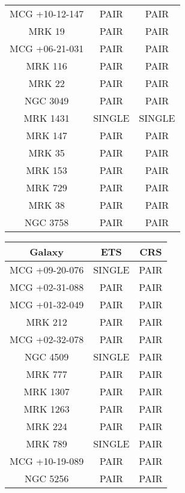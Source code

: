 \documentclass[12pt]{article}
\begin{document}
\begin{table}[!b]
{\begin{tabular}{|c|c|c|}
MCG +10-12-147 & PAIR             & PAIR             \\
MRK 19         & PAIR             & PAIR             \\
MCG +06-21-031 & PAIR             & PAIR             \\
MRK 116        & PAIR             & PAIR             \\
MRK 22         & PAIR             & PAIR             \\
NGC 3049       & PAIR             & PAIR             \\
MRK 1431       & SINGLE           & SINGLE           \\
MRK 147        & PAIR             & PAIR             \\
MRK 35         & PAIR             & PAIR             \\
MRK 153        & PAIR             & PAIR             \\
MRK 729        & PAIR             & PAIR             \\
MRK 38         & PAIR             & PAIR             \\
NGC 3758       & PAIR             & PAIR             \\
\hline
\end{tabular}
}
\hfill
\parbox{.45\linewidth}{
\begin{tabular}{|c|c|c|}
\hline
\textbf{Galaxy} & \textbf{ETS} & \textbf{CRS} \\
\hline

MCG +09-20-076 & SINGLE           & PAIR             \\
MCG +02-31-088 & PAIR             & PAIR             \\
MCG +01-32-049 & PAIR             & PAIR             \\
MRK 212        & PAIR             & PAIR             \\
MCG +02-32-078 & PAIR             & PAIR             \\
NGC 4509       & SINGLE           & PAIR             \\
MRK 777        & PAIR             & PAIR             \\
MRK 1307       & PAIR             & PAIR             \\
MRK 1263       & PAIR             & PAIR             \\
MRK 224        & PAIR             & PAIR             \\
MRK 789        & SINGLE           & PAIR             \\
MCG +10-19-089 & PAIR             & PAIR             \\
NGC 5256       & PAIR             & PAIR             \\


\end{tabular}}
\end{table}
\end{document}
